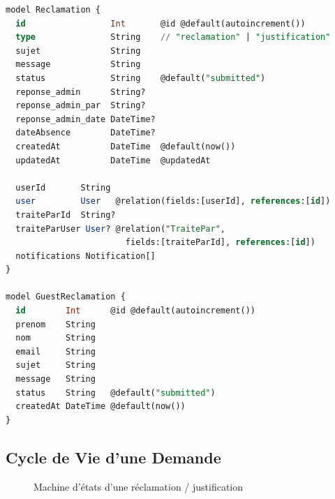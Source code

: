 \begin{lstlisting}[language=SQL,
  caption=schema.prisma — Modèles Reclamation et GuestReclamation]
model Reclamation {
  id                 Int       @id @default(autoincrement())
  type               String    // "reclamation" | "justification"
  sujet              String
  message            String
  status             String    @default("submitted")
  reponse_admin      String?
  reponse_admin_par  String?
  reponse_admin_date DateTime?
  dateAbsence        DateTime?
  createdAt          DateTime  @default(now())
  updatedAt          DateTime  @updatedAt

  userId       String
  user         User   @relation(fields:[userId], references:[id])
  traiteParId  String?
  traiteParUser User? @relation("TraitePar",
                        fields:[traiteParId], references:[id])
  notifications Notification[]
}

model GuestReclamation {
  id        Int      @id @default(autoincrement())
  prenom    String
  nom       String
  email     String
  sujet     String
  message   String
  status    String   @default("submitted")
  createdAt DateTime @default(now())
}
\end{lstlisting}

\subsection{Cycle de Vie d'une Demande}

\begin{figure}[H]
\centering
{}
\caption{Machine d'états d'une réclamation / justification}
\label{fig:states}
\end{figure}

